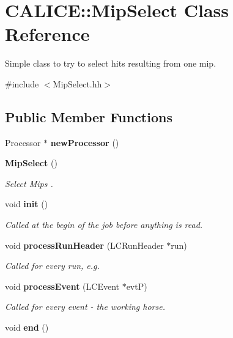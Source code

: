 \section{CALICE::MipSelect Class Reference}
\label{classCALICE_1_1MipSelect}


Simple class to try to select hits resulting from one mip.  


{\ttfamily \#include $<$MipSelect.hh$>$}\subsection*{Public Member Functions}
\begin{DoxyCompactItemize}
\item 
Processor $\ast$ {\bfseries newProcessor} ()\label{classCALICE_1_1MipSelect_a0f4980cc56e6302a351f1029f1259655}

\item 
{\bf MipSelect} ()
\begin{DoxyCompactList}\small\item\em Select Mips . \item\end{DoxyCompactList}\item 
void {\bf init} ()
\begin{DoxyCompactList}\small\item\em Called at the begin of the job before anything is read. \item\end{DoxyCompactList}\item 
void {\bf processRunHeader} (LCRunHeader $\ast$run)
\begin{DoxyCompactList}\small\item\em Called for every run, e.g. \item\end{DoxyCompactList}\item 
void {\bf processEvent} (LCEvent $\ast$evtP)\label{classCALICE_1_1MipSelect_a4fda653147df06d659939dfe36aceb34}

\begin{DoxyCompactList}\small\item\em Called for every event -\/ the working horse. \item\end{DoxyCompactList}\item 
void {\bfseries end} ()\label{classCALICE_1_1MipSelect_aa1e14b5e9e444acae637f2cbcc0511e0}

\end{DoxyCompactItemize}
